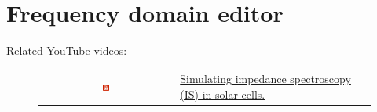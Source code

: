 \newpage
\section{Frequency domain editor}
Related YouTube videos:
\begin{figure}[H]

\begin{tabular}{ c l }

\includegraphics[width=0.05\textwidth]{./images/youtube.png}

&
\href{https://www.youtube.com/watch?v=NJAsZeiB5FU}{Simulating impedance spectroscopy (IS) in solar cells.}

\end{tabular}
\end{figure}

